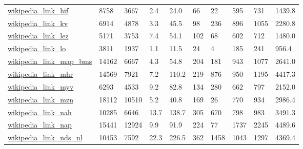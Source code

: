 \begin{longtable}{llllllllll}
 \href{http://konect.cc/networks/wikipedia_link_en}{wikipedia\_link\_hif}                                                     & 8758       & 3667  & 2.4    & 24.0   & 66    & 22     & 595    & 731    & 1439.8  \\
 \href{http://konect.cc/networks/wikipedia_link_en}{wikipedia\_link\_kv}                                                      & 6914       & 4878  & 3.3    & 45.5   & 98    & 236    & 896    & 1055   & 2280.8  \\
 \href{http://konect.cc/networks/wikipedia_link_en}{wikipedia\_link\_lez}                                                     & 5171       & 3753  & 7.4    & 54.1   & 102   & 68     & 602    & 712    & 1480.0  \\
 \href{http://konect.cc/networks/wikipedia_link_en}{wikipedia\_link\_lo}                                                      & 3811       & 1937  & 1.1    & 11.5   & 24    & 4      & 185    & 241    & 956.4   \\
 \href{http://konect.cc/networks/wikipedia_link_en}{wikipedia\_link\_map\_bms}                                                 & 14162      & 6667  & 4.3    & 54.8   & 204   & 181    & 943    & 1077   & 2641.0  \\
 \href{http://konect.cc/networks/wikipedia_link_en}{wikipedia\_link\_mhr}                                                     & 14569      & 7921  & 7.2    & 110.2  & 219   & 876    & 950    & 1195   & 4417.3  \\
 \href{http://konect.cc/networks/wikipedia_link_en}{wikipedia\_link\_myv}                                                     & 6293       & 4533  & 9.2    & 82.8   & 134   & 280    & 662    & 797    & 2152.0  \\
 \href{http://konect.cc/networks/wikipedia_link_en}{wikipedia\_link\_mzn}                                                     & 18112      & 10510 & 5.2    & 40.8   & 169   & 26     & 770    & 934    & 2986.4  \\
 \href{http://konect.cc/networks/wikipedia_link_en}{wikipedia\_link\_nah}                                                     & 10285      & 6646  & 13.7   & 138.7  & 305   & 670    & 798    & 983    & 3491.3  \\
 \href{http://konect.cc/networks/wikipedia_link_en}{wikipedia\_link\_nap}                                                     & 15441      & 12924 & 9.9    & 91.9   & 224   & 77     & 1737   & 2245   & 4489.6  \\
 \href{http://konect.cc/networks/wikipedia_link_en}{wikipedia\_link\_nds\_nl}                                                  & 10453      & 7592  & 22.3   & 226.5  & 362   & 1458   & 1043   & 1297   & 4369.4  \\

\end{longtable}
